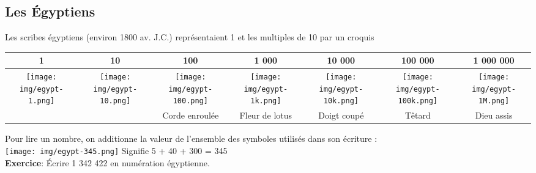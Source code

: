 \documentclass[12pt,a4paper]{article}
\begin{document}
\subsection{Les Égyptiens}
Les scribes égyptiens (environ 1800 av. J.C.) représentaient 1 et les multiples de 10 par un croquis
\begin{center}
\begin{tabular}{|c|c|c|c|c|c|c|}
\hline
1 & 10 & 100 & 1 000 & 10 000 & 100 000 & 1 000 000 \\\hline
\texttt{[image: img/egypt-1.png]} & 
\texttt{[image: img/egypt-10.png]}  & 
\texttt{[image: img/egypt-100.png]}  & 
\texttt{[image: img/egypt-1k.png]}  & 
\texttt{[image: img/egypt-10k.png]}  & 
\texttt{[image: img/egypt-100k.png]}  & 
\texttt{[image: img/egypt-1M.png]} \\ \hline
& & Corde enroulée & Fleur de lotus & Doigt coupé & Têtard & Dieu assis\\ \hline
\end{tabular}
\end{center}
Pour lire un nombre, on additionne la valeur de l’ensemble des symboles utilisés dans son écriture :\\
\texttt{[image: img/egypt-345.png]} Signifie 5 + 40 + 300 = 345\\
\textbf{Exercice}: Écrire 1 342 422 en numération égyptienne.\\
\end{document}

